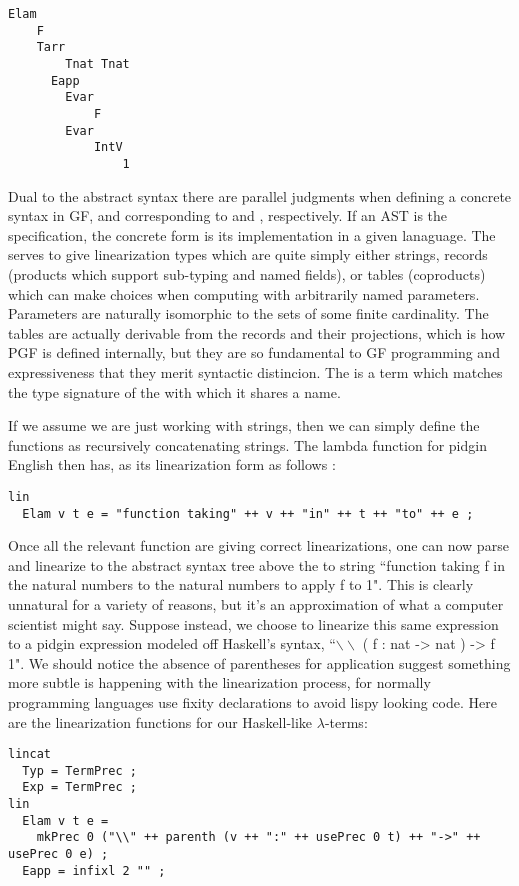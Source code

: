 \begin{verbatim} 
Elam
    F
    Tarr
        Tnat Tnat
      Eapp
        Evar
            F
        Evar
            IntV
                1
\end{verbatim} 

Dual to the abstract syntax there are parallel judgments when defining a
concrete syntax in GF,  and  corresponding to 
and , respectively. If an AST is the specification, the concrete form
is its implementation in a given lanaguage. The  serves to give
linearization types which are quite simply either strings, records (products
which support sub-typing and named fields), or tables (coproducts) which can
make choices when computing with arbitrarily named parameters. Parameters are
naturally isomorphic to the sets of some finite cardinality. The tables are
actually derivable from the records and their projections, which is how PGF is
defined internally, but they are so fundamental to GF programming and
expressiveness that they merit syntactic distincion. The  is a term
which matches the type signature of the  with which it shares a name.

If we assume we are just working with strings, then we can simply define the
functions as recursively concatenating \codeword{++} strings. The lambda function
for pidgin English then has, as its linearization form as follows :

\begin{verbatim}
lin 
  Elam v t e = "function taking" ++ v ++ "in" ++ t ++ "to" ++ e ;
\end{verbatim}

Once all the relevant function are giving correct linearizations, one can now
parse and linearize to the abstract syntax tree above the to string ``function
taking f in the natural numbers to the natural numbers to apply f to 1". This is
clearly unnatural for a variety of reasons, but it's an approximation of what
a computer scientist might say. Suppose instead, we choose to linearize this same
expression to a pidgin expression modeled off Haskell's syntax,
``$\backslash\backslash$ ( f : nat -> nat ) -> f 1". We should notice the absence of parentheses for
application suggest something more subtle is happening with the linearization
process, for normally programming languages use fixity declarations to avoid
lispy looking code. Here are the linearization functions for our Haskell-like
$\lambda$-terms:

\begin{verbatim}
lincat
  Typ = TermPrec ;
  Exp = TermPrec ;
lin
  Elam v t e = 
    mkPrec 0 ("\\" ++ parenth (v ++ ":" ++ usePrec 0 t) ++ "->" ++ usePrec 0 e) ;
  Eapp = infixl 2 "" ;
\end{verbatim}

